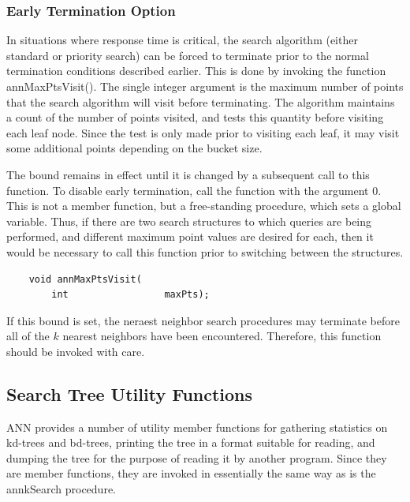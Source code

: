 \documentclass[11pt]{article}		%
\newcommand{\ANN}[0]{\textsf{ANN}}
\begin{document}
\subsubsection{Early Termination Option}\label{term.sec}

In situations where response time is critical, the search algorithm
(either standard or priority search) can be forced to terminate prior to
the normal termination conditions described earlier.  This is done by
invoking the function \textsf{annMaxPtsVisit()}.  The single integer
argument is the maximum number of points that the search algorithm will
visit before terminating.  The algorithm maintains a count of the number
of points visited, and tests this quantity before visiting each leaf
node.  Since the test is only made prior to visiting each leaf, it may
visit some additional points depending on the bucket size.

The bound remains in effect until it is changed by a subsequent call to
this function.  To disable early termination, call the function
with the argument 0.  This is not a member function, but a free-standing
procedure, which sets a global variable.  Thus, if there are two search
structures to which queries are being performed, and different maximum
point values are desired for each, then it would be necessary to call
this function prior to switching between the structures.

{\small \begin{verbatim}
    void annMaxPtsVisit(
        int                 maxPts);
\end{verbatim} }

If this bound is set, the neraest neighbor search procedures may
terminate before all of the $k$ nearest neighbors have been encountered.
Therefore, this function should be invoked with care.

\subsection{Search Tree Utility Functions}\label{utilproc.sec}

{\ANN} provides a number of utility member functions for gathering statistics
on kd-trees and bd-trees, printing the tree in a format suitable for
reading, and dumping the tree for the purpose of reading it by another
program.  Since they are member functions, they are invoked in essentially
the same way as is the \textsf{annkSearch} procedure.
\end{document}

